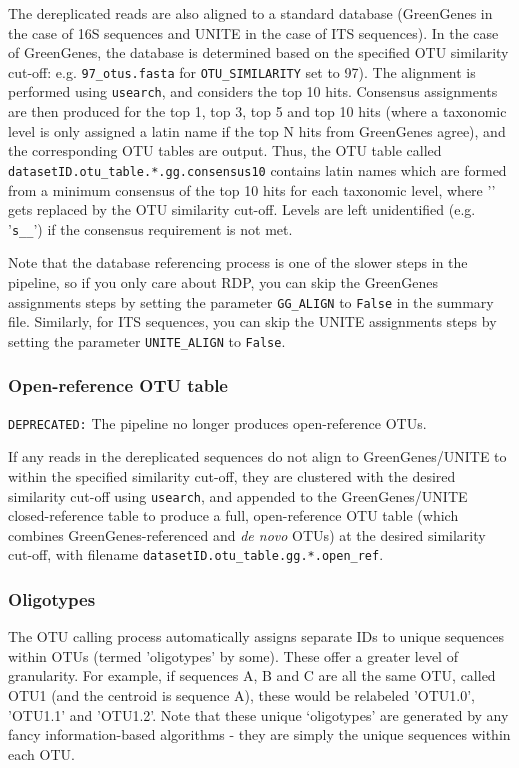 \documentclass[11pt, oneside]{article}   	%
\begin{document}
The dereplicated reads are also aligned to a standard database (GreenGenes in the case of 16S sequences and UNITE in the case of ITS sequences).  In the case of GreenGenes, the database is determined based on the specified OTU similarity cut-off: e.g. {\tt 97\_otus.fasta} for {\tt OTU\_SIMILARITY} set to 97).  The alignment is performed using {\tt usearch}, and considers the top 10 hits.  Consensus assignments are then produced for the top 1, top 3, top 5 and top 10 hits (where a taxonomic level is only assigned a latin name if the top N hits from GreenGenes agree), and the corresponding OTU tables are output.  Thus, the OTU table called {\tt datasetID.otu\_table.*.gg.consensus10} contains latin names which are formed from a minimum consensus of the top 10 hits for each taxonomic level, where '{\tt *}' gets replaced by the OTU similarity cut-off.  Levels are left unidentified (e.g. '{\tt s\_\_}') if the consensus requirement is not met.  

Note that the database referencing process is one of the slower steps in the pipeline, so if you only care about RDP, you can skip the GreenGenes assignments steps by setting the parameter {\tt GG\_ALIGN} to {\tt False} in the summary file.  Similarly, for ITS sequences, you can skip the UNITE assignments steps by setting the parameter {\tt UNITE\_ALIGN} to {\tt False}.

\subsubsection{Open-reference OTU table}
{\tt DEPRECATED:} The pipeline no longer produces open-reference OTUs. 

If any reads in the dereplicated sequences do not align to GreenGenes/UNITE to within the specified similarity cut-off, they are clustered with the desired similarity cut-off using {\tt usearch}, and appended to the GreenGenes/UNITE closed-reference table to produce a full, open-reference OTU table (which combines GreenGenes-referenced and \textit{de novo} OTUs) at the desired similarity cut-off, with filename {\tt datasetID.otu\_table.gg.*.open\_ref}.

\subsubsection{Oligotypes}
The OTU calling process automatically assigns separate IDs to unique sequences within OTUs (termed 'oligotypes' by some).  These offer a greater level of granularity.  For example, if sequences A, B and C are all the same OTU, called OTU1 (and the centroid is sequence A), these would be relabeled 'OTU1.0', 'OTU1.1' and 'OTU1.2'. Note that
these unique `oligotypes' are generated by any fancy information-based algorithms -
they are simply the unique sequences within each OTU.
\end{document}
